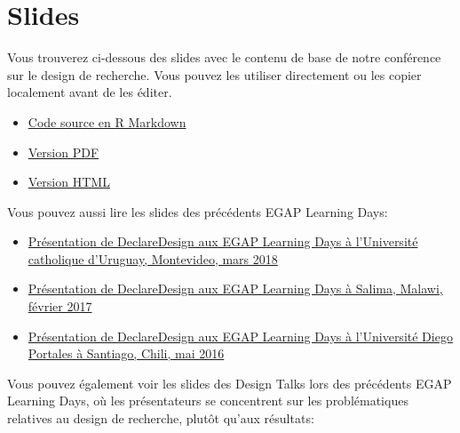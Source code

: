 \documentclass[
  12pt,
]{book}
\begin{document}
\hypertarget{slides}{%
\section{Slides}\label{slides}}

Vous trouverez ci-dessous des slides avec le contenu de base de notre conférence sur le design de recherche. Vous pouvez les utiliser directement ou les copier localement avant de les éditer.

\begin{itemize}
\item
  \href{https://egap.github.io/learningdays-resources/Slides/researchdesignform-slides.Rmd}{Code source en R Markdown}
\item
  \href{https://egap.github.io/learningdays-resources/Slides/researchdesignform-slides.pdf}{Version PDF}
\item
  \href{https://egap.github.io/learningdays-resources/Slides/researchdesignform-slides.html}{Version HTML}
\end{itemize}

Vous pouvez aussi lire les slides des précédents EGAP Learning Days:

\begin{itemize}
\item
  \href{https://egap.github.io/learningdays-resources/Slides/Examples/declare_design-montevideo.pdf}{Présentation de DeclareDesign aux EGAP Learning Days à l'Université catholique d'Uruguay, Montevideo, mars 2018}
\item
  \href{https://egap.github.io/learningdays-resources/Slides/Examples/declare_design-malawi.pdf}{Présentation de DeclareDesign aux EGAP Learning Days à Salima, Malawi, février 2017}
\item
  \href{https://egap.github.io/learningdays-resources/Slides/Examples/declare_design-santiago.pdf}{Présentation de DeclareDesign aux EGAP Learning Days à l'Université Diego Portales à Santiago, Chili, mai 2016}
\end{itemize}

Vous pouvez également voir les slides des Design Talks lors des précédents EGAP Learning Days, où les présentateurs se concentrent sur les problématiques relatives au design de recherche, plutôt qu'aux résultats:
\end{document}
